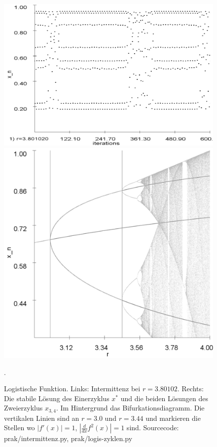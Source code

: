 \documentclass{scrartcl}
\begin{document}
\begin{figure}
\centering
\includegraphics[scale=0.22]{intermittenz}
\includegraphics[scale=0.15]{analy-periodenv}
\caption{Logistische Funktion. Links: Intermittenz bei $r=3.80102$. Rechts: Die stabile Lösung des Einerzyklus $x^*$ und die beiden Lösungen des Zweierzyklus $x_{3,4}$. Im Hintergrund das Bifurkationsdiagramm. Die vertikalen Linien sind an $r=3.0$ und $r=3.44$ und markieren die Stellen wo $|f'(x)|=1$, $|\frac{d}{dx}f^2(x)|=1$ sind. Sourcecode: prak/intermittenz.py, prak/logis-zyklen.py}. 
\label{fig:log-intermittenz-cycles}
\end{figure}
\end{document}
